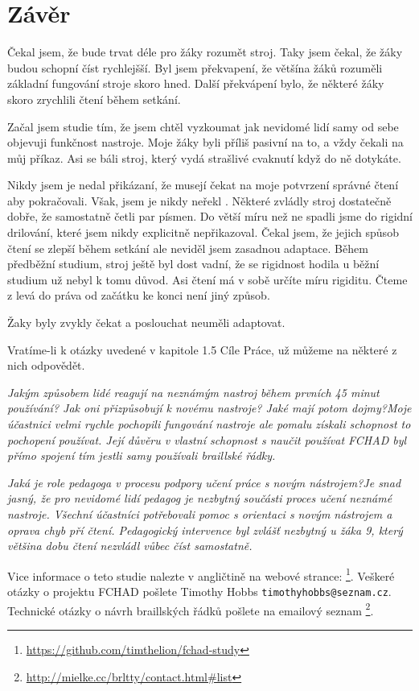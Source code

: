\chapter{Závěr}
Čekal jsem, že bude trvat déle pro žáky rozumět stroj.  Taky jsem čekal, že žáky budou schopní číst rychlejšší. Byl jsem překvapení, že většína žáků rozuměli základní fungování stroje skoro hned. Další překvápení bylo, že některé žáky skoro zrychlili čtení během setkání.

Začal jsem studie tím, že jsem chtěl vyzkoumat jak nevidomé lidí samy od sebe objevuji funkčnost nastroje. Moje žáky byli příliš pasivní na to, a vždy čekali na můj příkaz. Asi se báli stroj, který vydá strašlivé cvaknutí když do ně dotykáte.

Nikdy jsem je nedal přikázaní, že musejí čekat na moje potvrzení správné čtení aby pokračovali. Však, jsem je nikdy neřekl . Některé zvládly stroj dostatečně dobře, že samostatně četli par písmen. Do větší míru než ne spadli jsme do rigidní drilování, které jsem nikdy explicitně nepřikazoval.  Čekal jsem, že jejich spůsob čtení se zlepší během setkání ale neviděl jsem zasadnou adaptace. Během předběžní studium, stroj ještě byl dost vadní, že se rigidnost hodila u běžní studium už nebyl k tomu důvod. Asi čtení má v sobě určíte míru rigiditu. Čteme z levá do práva od začátku ke konci není jiný způsob.

Žaky byly zvykly čekat a poslouchat neuměli adaptovat.

Vratíme-li k otázky uvedené v kapitole 1.5 Cíle Práce, už můžeme na některé z nich odpovědět.

\em Jakým způsobem lidé reagují na neznámým nastroj během prvních 45 minut používání? Jak oni přizpůsobují k novému nastroje? Jaké mají potom dojmy?\em  Moje účastnici velmi rychle pochopili fungování nastroje ale pomalu získali schopnost to pochopení používat.  Její důvěru v vlastní schopnost s naučit používat FCHAD byl přímo spojení tím jestli samy používali braillské řádky.

\em Jaká je role pedagoga v procesu podpory učení práce s novým nástrojem?\em Je snad jasný, že pro nevidomé lidí pedagog je nezbytný součásti proces učení neznámé nastroje.  Všechní účastníci potřebovali pomoc s orientaci s novým nástrojem a oprava chyb pří čtení.  Pedagogický intervence byl zvlášť nezbytný u žáka 9, který většina dobu čtení nezvládl vůbec číst samostatně.

Vice informace o teto studie nalezte v angličtině na webové strance: \footnote{\url{https://github.com/timthelion/fchad-study}}.  Veškeré otázky o projektu FCHAD pošlete Timothy Hobbs {\tt timothyhobbs@seznam.cz}.  Technické otázky o návrh braillských řádků pošlete na emailový seznam
\footnote{\url{ http://mielke.cc/brltty/contact.html#list}}.


